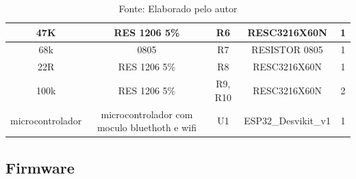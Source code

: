 \documentclass[../delivery_hospital_report.tex]{subfiles}
\begin{document}
\begin{table}[]
\begin{adjustbox}{width=\columnwidth,center}
\begin{tabular}{|c|c|c|c|c|}
47K              & RES 1206 5\%                                   & R6                         & RESC3216X60N             & 1        \\ \hline
68k              & 0805                                           & R7                         & RESISTOR 0805            & 1        \\ \hline
22R              & RES 1206 5\%                                   & R8                         & RESC3216X60N             & 1        \\ \hline
100k             & RES 1206 5\%                                   & R9, R10                    & RESC3216X60N             & 2        \\ \hline
microcontrolador & microcontrolador com   moculo bluethoth e wifi & U1                         & ESP32\_Desvikit\_v1      & 1        \\ \hline

\end{tabular}
\end{adjustbox}
\centering
\caption*{Fonte: Elaborado pelo autor}
\label{table:voc}
\end{table}

\subsection{Firmware}
\end{document}

